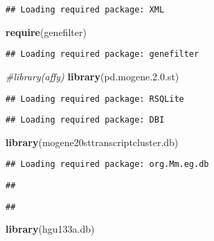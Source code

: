 \documentclass[]{article}
\newenvironment{Shaded}{\begin{snugshade}}{\end{snugshade}}
\newcommand{\KeywordTok}[1]{\textcolor[rgb]{0.13,0.29,0.53}{\textbf{#1}}}
\newcommand{\FloatTok}[1]{\textcolor[rgb]{0.00,0.00,0.81}{#1}}
\newcommand{\CommentTok}[1]{\textcolor[rgb]{0.56,0.35,0.01}{\textit{#1}}}
\newcommand{\NormalTok}[1]{#1}
\begin{document}
\begin{verbatim}
## Loading required package: XML
\end{verbatim}

\begin{Shaded}
\begin{Highlighting}[]
\KeywordTok{require}\NormalTok{(genefilter)}
\end{Highlighting}
\end{Shaded}

\begin{verbatim}
## Loading required package: genefilter
\end{verbatim}

\begin{Shaded}
\begin{Highlighting}[]
\CommentTok{#library(affy)}
\KeywordTok{library}\NormalTok{(pd.mogene.}\FloatTok{2.0}\NormalTok{.st)}
\end{Highlighting}
\end{Shaded}

\begin{verbatim}
## Loading required package: RSQLite
\end{verbatim}

\begin{verbatim}
## Loading required package: DBI
\end{verbatim}

\begin{Shaded}
\begin{Highlighting}[]
\KeywordTok{library}\NormalTok{(mogene20sttranscriptcluster.db)}
\end{Highlighting}
\end{Shaded}

\begin{verbatim}
## Loading required package: org.Mm.eg.db
\end{verbatim}

\begin{verbatim}
## 
\end{verbatim}

\begin{verbatim}
## 
\end{verbatim}

\begin{Shaded}
\begin{Highlighting}[]
\KeywordTok{library}\NormalTok{(hgu133a.db)}
\end{Highlighting}
\end{Shaded}
\end{document}
